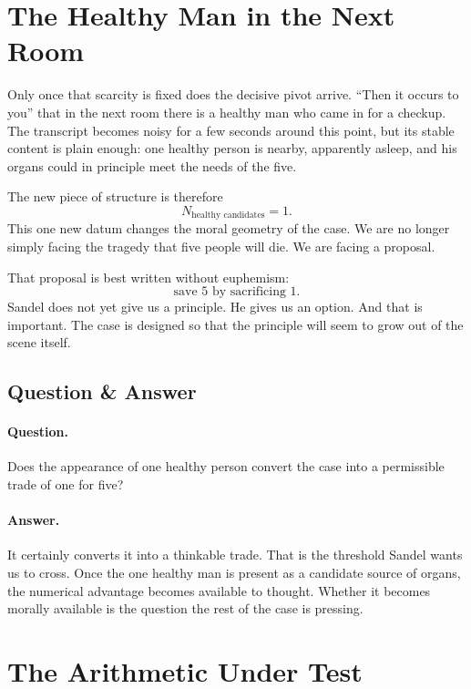 \section{The Healthy Man in the Next Room}

Only once that scarcity is fixed does the decisive pivot arrive. ``Then it occurs to you'' that in the next room there is a healthy man who came in for a checkup. The transcript becomes noisy for a few seconds around this point, but its stable content is plain enough: one healthy person is nearby, apparently asleep, and his organs could in principle meet the needs of the five.

The new piece of structure is therefore
\begin{equation}
N_{\text{healthy candidates}} = 1.
\end{equation}
This one new datum changes the moral geometry of the case. We are no longer simply facing the tragedy that five people will die. We are facing a proposal.

That proposal is best written without euphemism:
\begin{equation}
\text{save }5\text{ by sacrificing }1.
\end{equation}
Sandel does not yet give us a principle. He gives us an option. And that is important. The case is designed so that the principle will seem to grow out of the scene itself.

\subsection{Question \& Answer}

\paragraph{Question.} Does the appearance of one healthy person convert the case into a permissible trade of one for five?

\paragraph{Answer.} It certainly converts it into a thinkable trade. That is the threshold Sandel wants us to cross. Once the one healthy man is present as a candidate source of organs, the numerical advantage becomes available to thought. Whether it becomes morally available is the question the rest of the case is pressing.

\section{The Arithmetic Under Test}

